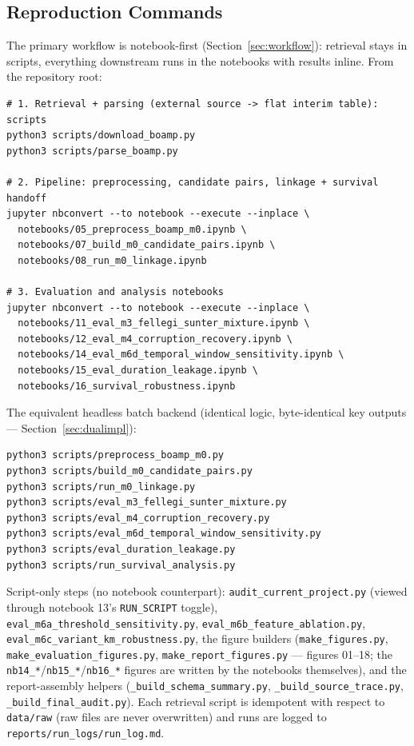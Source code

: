 \documentclass[11pt]{article}
\begin{document}
\subsection{Reproduction Commands}
The primary workflow is notebook-first (Section~\ref{sec:workflow}):
retrieval stays in scripts, everything downstream runs in the notebooks
with results inline. From the repository root:
\begin{verbatim}
# 1. Retrieval + parsing (external source -> flat interim table): scripts
python3 scripts/download_boamp.py
python3 scripts/parse_boamp.py

# 2. Pipeline: preprocessing, candidate pairs, linkage + survival handoff
jupyter nbconvert --to notebook --execute --inplace \
  notebooks/05_preprocess_boamp_m0.ipynb \
  notebooks/07_build_m0_candidate_pairs.ipynb \
  notebooks/08_run_m0_linkage.ipynb

# 3. Evaluation and analysis notebooks
jupyter nbconvert --to notebook --execute --inplace \
  notebooks/11_eval_m3_fellegi_sunter_mixture.ipynb \
  notebooks/12_eval_m4_corruption_recovery.ipynb \
  notebooks/14_eval_m6d_temporal_window_sensitivity.ipynb \
  notebooks/15_eval_duration_leakage.ipynb \
  notebooks/16_survival_robustness.ipynb
\end{verbatim}
The equivalent headless batch backend (identical logic, byte-identical key
outputs --- Section~\ref{sec:dualimpl}):
\begin{verbatim}
python3 scripts/preprocess_boamp_m0.py
python3 scripts/build_m0_candidate_pairs.py
python3 scripts/run_m0_linkage.py
python3 scripts/eval_m3_fellegi_sunter_mixture.py
python3 scripts/eval_m4_corruption_recovery.py
python3 scripts/eval_m6d_temporal_window_sensitivity.py
python3 scripts/eval_duration_leakage.py
python3 scripts/run_survival_analysis.py
\end{verbatim}
Script-only steps (no notebook counterpart):
\texttt{audit\_current\_project.py} (viewed through notebook 13's
\texttt{RUN\_SCRIPT} toggle), \texttt{eval\_m6a\_threshold\_sensitivity.py},
\texttt{eval\_m6b\_feature\_ablation.py},
\texttt{eval\_m6c\_variant\_km\_robustness.py}, the figure builders
(\texttt{make\_figures.py}, \texttt{make\_evaluation\_figures.py},
\texttt{make\_report\_figures.py} --- figures 01--18; the
\texttt{nb14\_*}/\texttt{nb15\_*}/\texttt{nb16\_*} figures are written by
the notebooks themselves), and the report-assembly helpers
(\texttt{\_build\_schema\_summary.py}, \texttt{\_build\_source\_trace.py},
\texttt{\_build\_final\_audit.py}). Each retrieval script is idempotent
with respect to \texttt{data/raw} (raw files are never overwritten) and
runs are logged to \texttt{reports/run\_logs/run\_log.md}.
\end{document}
